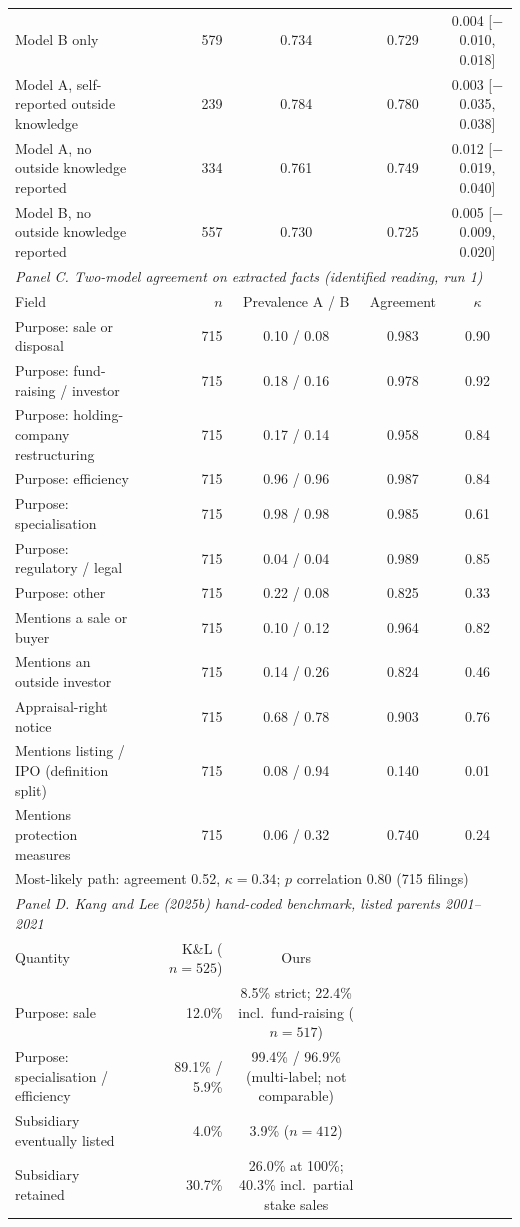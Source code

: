 \begin{tabular}{llrccc}
Model B only & & 579 & 0.734 & 0.729 & 0.004 [$-$0.010, 0.018] \\
Model A, self-reported outside knowledge & & 239 & 0.784 & 0.780 & 0.003 [$-$0.035, 0.038] \\
Model A, no outside knowledge reported & & 334 & 0.761 & 0.749 & 0.012 [$-$0.019, 0.040] \\
Model B, no outside knowledge reported & & 557 & 0.730 & 0.725 & 0.005 [$-$0.009, 0.020] \\
\midrule
\multicolumn{6}{l}{\emph{Panel C. Two-model agreement on extracted facts (identified reading, run 1)}} \\
Field & & $n$ & Prevalence A / B & Agreement & $\kappa$ \\
\midrule
Purpose: sale or disposal & & 715 & 0.10 / 0.08 & 0.983 & 0.90 \\
Purpose: fund-raising / investor & & 715 & 0.18 / 0.16 & 0.978 & 0.92 \\
Purpose: holding-company restructuring & & 715 & 0.17 / 0.14 & 0.958 & 0.84 \\
Purpose: efficiency & & 715 & 0.96 / 0.96 & 0.987 & 0.84 \\
Purpose: specialisation & & 715 & 0.98 / 0.98 & 0.985 & 0.61 \\
Purpose: regulatory / legal & & 715 & 0.04 / 0.04 & 0.989 & 0.85 \\
Purpose: other & & 715 & 0.22 / 0.08 & 0.825 & 0.33 \\
Mentions a sale or buyer & & 715 & 0.10 / 0.12 & 0.964 & 0.82 \\
Mentions an outside investor & & 715 & 0.14 / 0.26 & 0.824 & 0.46 \\
Appraisal-right notice & & 715 & 0.68 / 0.78 & 0.903 & 0.76 \\
Mentions listing / IPO (definition split) & & 715 & 0.08 / 0.94 & 0.140 & 0.01 \\
Mentions protection measures & & 715 & 0.06 / 0.32 & 0.740 & 0.24 \\
\multicolumn{6}{l}{Most-likely path: agreement 0.52, $\kappa = 0.34$; $p$ correlation 0.80 (715 filings)} \\
\midrule
\multicolumn{6}{l}{\emph{Panel D. Kang and Lee (2025b) hand-coded benchmark, listed parents 2001--2021}} \\
Quantity & & K\&L ($n = 525$) & Ours & & \\
\midrule
Purpose: sale & & 12.0\% & 8.5\% strict; 22.4\% incl.\ fund-raising ($n = 517$) & & \\
Purpose: specialisation / efficiency & & 89.1\% / 5.9\% & 99.4\% / 96.9\% (multi-label; not comparable) & & \\
Subsidiary eventually listed & & 4.0\% & 3.9\% ($n = 412$) & & \\
Subsidiary retained & & 30.7\% & 26.0\% at 100\%; 40.3\% incl.\ partial stake sales & & \\
\bottomrule
\end{tabular}
